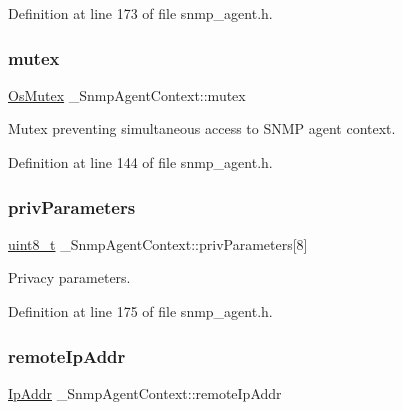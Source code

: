 Definition at line 173 of file snmp\+\_\+agent.\+h.

\mbox{\label{struct__SnmpAgentContext_ac55df4650c324346673f1560eda9b6b9}} 
\subsubsection{\texorpdfstring{mutex}{mutex}}
{\footnotesize\ttfamily \hyperlink{structOsMutex}{Os\+Mutex} \+\_\+\+Snmp\+Agent\+Context\+::mutex}



Mutex preventing simultaneous access to S\+N\+MP agent context. 



Definition at line 144 of file snmp\+\_\+agent.\+h.

\mbox{\label{struct__SnmpAgentContext_a2acacbc3099bc626c266549a55e4a743}} 
\subsubsection{\texorpdfstring{priv\+Parameters}{privParameters}}
{\footnotesize\ttfamily \hyperlink{stdint_8h_aba7bc1797add20fe3efdf37ced1182c5}{uint8\+\_\+t} \+\_\+\+Snmp\+Agent\+Context\+::priv\+Parameters\mbox{[}8\mbox{]}}



Privacy parameters. 



Definition at line 175 of file snmp\+\_\+agent.\+h.

\mbox{\label{struct__SnmpAgentContext_a466c4deeaf1d486a1c13e3163daf986a}} 
\subsubsection{\texorpdfstring{remote\+Ip\+Addr}{remoteIpAddr}}
{\footnotesize\ttfamily \hyperlink{structIpAddr}{Ip\+Addr} \+\_\+\+Snmp\+Agent\+Context\+::remote\+Ip\+Addr}



